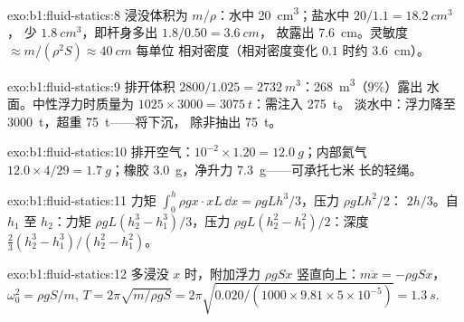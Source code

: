 \begin{solution}{exo:b1:fluid-statics:8}
浸没体积为 $m/\rho$：水中 \qty{20}{cm^3}；盐水中 $20/1.1 = \qty{18.2}{cm^3}$，
少 $\qty{1.8}{cm^3}$，即杆身多出 $1.8/0.50 = \qty{3.6}{cm}$，
故露出 \qty{7.6}{cm}。灵敏度 $\approx m/(\rho^2S) \approx \qty{40}{cm}$ 每单位
相对密度（相对密度变化 $0.1$ 时约 \qty{3.6}{cm}）。
\end{solution}

\begin{solution}{exo:b1:fluid-statics:9}
排开体积 $2800/1.025 = \qty{2732}{m^3}$：\qty{268}{m^3}（$9\%$）露出
水面。中性浮力时质量为 $1025 \times 3000 = \qty{3075}{t}$：需注入 \qty{275}{t}。
淡水中：浮力降至 \qty{3000}{t}，超重 \qty{75}{t}——将下沉，
除非抽出 \qty{75}{t}。
\end{solution}

\begin{solution}{exo:b1:fluid-statics:10}
排开空气：$10^{-2} \times 1.20 = \qty{12.0}{g}$；内部氦气 $12.0 \times
4/29 = \qty{1.7}{g}$；橡胶 \qty{3.0}{g}，净升力 \qty{7.3}{g}——可承托七米
长的轻绳。
\end{solution}

\begin{solution}{exo:b1:fluid-statics:11}
力矩 $\int_0^h\rho gx\cdot xL\,\dd x = \rho gLh^3/3$，压力 $\rho gLh^2/2$：
 $2h/3$。自 $h_1$ 至 $h_2$：力矩 $\rho gL(h_2^3 - h_1^3)/3$，压力
$\rho gL(h_2^2 - h_1^2)/2$：深度 $\frac23(h_2^3 - h_1^3)/(h_2^2 - h_1^2)$。
\end{solution}

\begin{solution}{exo:b1:fluid-statics:12}
多浸没 $x$ 时，附加浮力 $\rho gSx$ 竖直向上：$m\ddot x = -\rho gSx$，
$\omega_0^2 = \rho gS/m$, $T = 2\pi\sqrt{m/\rho gS} = 2\pi\sqrt{0.020/(1000 \times
9.81 \times 5\times10^{-5})} = \qty{1.3}{s}$.
\end{solution}

